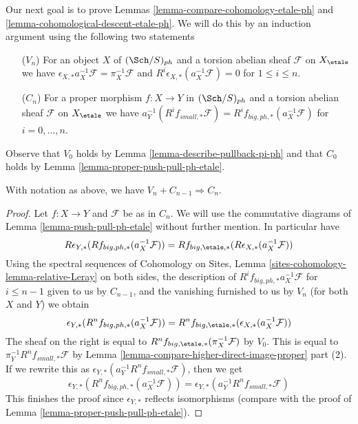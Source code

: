 \noindent
Our next goal is to prove Lemmas \ref{lemma-compare-cohomology-etale-ph} and
\ref{lemma-cohomological-descent-etale-ph}. We will do this by an induction
argument using the following two statements
\begin{enumerate}
\item[($V_n$)] For an object $X$ of $(\Sch/S)_{ph}$ and a
torsion abelian sheaf $\mathcal{F}$ on $X_\etale$ we have
$\epsilon_{X, *}a_X^{-1}\mathcal{F} = \pi_X^{-1}\mathcal{F}$ and
$R^i\epsilon_{X, *}(a_X^{-1}\mathcal{F}) = 0$
for $1 \leq i \leq n$.
\item[($C_n$)] For a proper morphism $f : X \to Y$ in $(\Sch/S)_{ph}$
and a torsion abelian sheaf $\mathcal{F}$ on $X_\etale$ we have
$a_Y^{-1}(R^if_{small, *}\mathcal{F}) =
R^if_{big, ph, *}(a_X^{-1}\mathcal{F})$
for $i = 0, \ldots, n$.
\end{enumerate}
Observe that $V_0$ holds by Lemma \ref{lemma-describe-pullback-pi-ph}
and that $C_0$ holds by
Lemma \ref{lemma-proper-push-pull-ph-etale}.

\begin{lemma}
\label{lemma-V-implies-C-etale-ph}
With notation as above, we have $V_n + C_{n - 1} \Rightarrow C_n$.
\end{lemma}

\begin{proof}
Let $f : X \to Y$ and $\mathcal{F}$ be as in $C_n$.
We will use the commutative diagrams of
Lemma \ref{lemma-push-pull-ph-etale}
without further mention. In particular have
$$
R\epsilon_{Y, *}(Rf_{big, ph, *}(a_X^{-1}\mathcal{F})) =
Rf_{big, \etale, *}(R\epsilon_{X, *}(a_X^{-1}\mathcal{F}))
$$
Using the spectral sequences of
Cohomology on Sites, Lemma \ref{sites-cohomology-lemma-relative-Leray}
on both sides, the description of $R^if_{big, ph, *}a_X^{-1}\mathcal{F}$
for $i \leq n - 1$ given to us by $C_{n - 1}$, and
the vanishing furnished to us by $V_n$
(for both $X$ and $Y$) we obtain 
$$
\epsilon_{Y, *}(R^nf_{big, ph, *}(a_X^{-1}\mathcal{F})) =
R^nf_{big, \etale, *}(\epsilon_{X, *}(a_X^{-1}\mathcal{F}))
$$
The sheaf on the right is equal to
$R^nf_{big, \etale, *}(\pi_X^{-1}\mathcal{F})$ by $V_0$.
This is equal to
$\pi_Y^{-1} R^nf_{small, *}\mathcal{F}$
by Lemma \ref{lemma-compare-higher-direct-image-proper} part (2).
If we rewrite this as
$\epsilon_{Y, *}(a_Y^{-1}R^nf_{small, *}\mathcal{F})$, then we get
$$
\epsilon_{Y, *}(R^nf_{big, ph, *}(a_X^{-1}\mathcal{F})) =
\epsilon_{Y, *}(a_Y^{-1}R^nf_{small, *}\mathcal{F})
$$
This finishes the proof since $\epsilon_{Y, *}$ reflects
isomorphisms (compare with the
proof of Lemma \ref{lemma-proper-push-pull-ph-etale}).
\end{proof}

